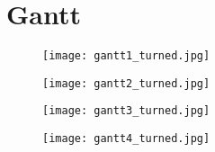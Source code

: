 \label{tab:PlanungMeilensteineTable}
\section{Gantt} 
\label{sec:PlanungGantt} 
\begin{landscape}
	\begin{figure}[htbp]
		\centering
		\texttt{[image: gantt1\_turned.jpg]}
		\label{fig:gantt1}
	\end{figure}

	\begin{figure}[htbp]
		\centering
		\texttt{[image: gantt2\_turned.jpg]}
		\label{fig:gantt2}
	\end{figure}

	\begin{figure}[htbp]
		\centering
		\texttt{[image: gantt3\_turned.jpg]}
		\label{fig:gantt3}
	\end{figure}

	\begin{figure}[htbp]
		\centering
		\texttt{[image: gantt4\_turned.jpg]}
		\label{fig:gantt4}
	\end{figure}

\end{landscape}



